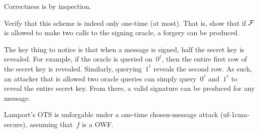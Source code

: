 \documentclass[11pt]{article}
\begin{document}
\noindent Correctness is by inspection.

\begin{question}
  Verify that this scheme is indeed only one-time (at most).
  That is, show that if $\mathcal{F}$ is allowed to make two calls to the signing oracle, a forgery can be produced.
\end{question}

\begin{answer}
  The key thing to notice is that when a message is signed, half the secret key is revealed.
  For example, if the oracle is queried on~$0^{\ell}$, then the entire first row of the secret key is revealed.
  Similarly, querying~$1^{\ell}$ reveals the second row.
  As such, an attacker that is allowed two oracle queries can simply query~$0^{\ell}$ and~$1^{\ell}$ to reveal the entire secret key.
  From there, a valid signature can be produced for any message.
\end{answer}

\begin{theorem}%
  \label{thm:ots-1cma}
  Lamport's OTS is unforgable under a one-time chosen-message attack (uf-1cma-secure), assuming that~$f$ is a OWF\@.
\end{theorem}
\end{document}
